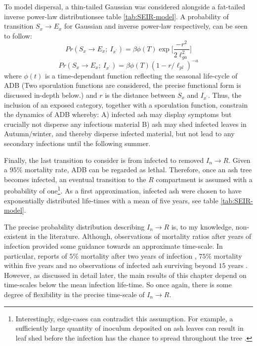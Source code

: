To model dispersal, a thin-tailed Gaussian was considered alongside a fat-tailed inverse power-law distribution\textemdash see table \ref{tab:SEIR-model}. A probability of transition $S_x \rightarrow E_x$ for Gaussian and inverse power-law respectively, can be seen to follow:
\begin{equation}
    Pr(S_{x} \rightarrow E_{x} ;\ I_{x^{\prime}} ) = \beta  \phi(T) \exp\Big[\frac{-r^2}{2\ell^2_{ga}}\Big] 
\end{equation}
\begin{equation}
    Pr(S_{x} \rightarrow E_{x} ;\ I_{x^{\prime}} ) = \beta \phi(T) (1 - r/\ell_{pl})^{-a}
\end{equation}
where $\phi(t)$ is a time-dependant function reflecting the seasonal life-cycle of ADB (Two sporulation functions are considered, the precise functional form is discussed in-depth below.) and $r$ is the distance between $S_x$ and $I_{x^\prime}$. Thus, the inclusion of an exposed category, together with a sporulation function, constrain the dynamics of ADB whereby: A) infected ash may display symptoms but crucially not disperse any infectious material B) ash may shed infected leaves in Autumn/winter, and thereby disperse infected material, but not lead to any secondary infections until the following summer.

Finally, the last transition to consider is from infected to removed $I_{n}\rightarrow R$. Given a $95\%$ mortality rate, ADB can be regarded as lethal. Therefore, once an ash tree becomes infected, an eventual transition to the $R$ compartment is assumed with a probability of one\footnote{Interestingly, edge-cases can contradict this assumption. For example, a sufficiently large quantity of inoculum deposited on ash leaves can result in leaf shed before the infection has the chance to spread throughout the tree \cite{https://doi.org/10.1111/mpp.12073}.}. As a first approximation, infected ash were chosen to have exponentially distributed life-times with a mean of five years, see table \ref{tab:SEIR-model}. 

The precise probability distribution describing $I_{n}\rightarrow R$ is, to my knowledge, non-existent in the literature. Although, observations of mortality ratios after years of infection provided some guidance towards an approximate time-scale. In particular, reports of $5\%$ mortality after two years of infection \cite{kessler2012dieback}, $75\%$ mortality within five years \cite{langer2015ash} and no observations of infected ash surviving beyond $15$ years \cite{wylder2018evidence}. However, as discussed in detail later, the main results of this chapter depend on time-scales below the mean infection life-time. So once again, there is some degree of flexibility in the precise time-scale of $I_{n}\rightarrow R$.


